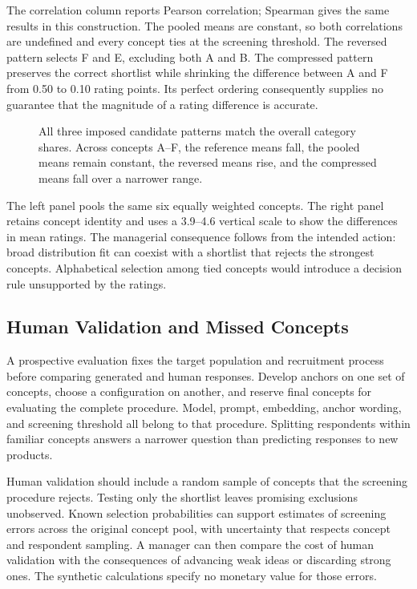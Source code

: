 The correlation column reports Pearson correlation; Spearman gives the
same results in this construction. The pooled means are constant, so
both correlations are undefined and every concept ties at the screening
threshold. The reversed pattern selects F and E, excluding both A and B.
The compressed pattern preserves the correct shortlist while shrinking
the difference between A and F from 0.50 to 0.10 rating points. Its
perfect ordering consequently supplies no guarantee that the magnitude
of a rating difference is accurate.

\begin{figure}[htbp]
\centering

\caption{All three imposed candidate patterns match the overall category shares. Across concepts A–F, the reference means fall, the pooled means remain constant, the reversed means rise, and the compressed means fall over a narrower range.}\label{fig:M04_concept_screening}
\end{figure}

The left panel pools the same six equally weighted concepts. The right
panel retains concept identity and uses a 3.9--4.6 vertical scale to
show the differences in mean ratings. The managerial consequence follows
from the intended action: broad distribution fit can coexist with a
shortlist that rejects the strongest concepts. Alphabetical selection
among tied concepts would introduce a decision rule unsupported by the
ratings.

\hypertarget{M04-human-validation-and-missed-concepts}{%
\subsection{Human Validation and Missed
Concepts}\label{M04-human-validation-and-missed-concepts}}

\noindent \noindent A prospective evaluation fixes the target population and
recruitment process before comparing generated and human responses.
Develop anchors on one set of concepts, choose a configuration on
another, and reserve final concepts for evaluating the complete
procedure. Model, prompt, embedding, anchor wording, and screening
threshold all belong to that procedure. Splitting respondents within
familiar concepts answers a narrower question than predicting responses
to new products.

Human validation should include a random sample of concepts that the
screening procedure rejects. Testing only the shortlist leaves promising
exclusions unobserved. Known selection probabilities can support
estimates of screening errors across the original concept pool, with
uncertainty that respects concept and respondent sampling. A manager can
then compare the cost of human validation with the consequences of
advancing weak ideas or discarding strong ones. The synthetic
calculations specify no monetary value for those errors.

